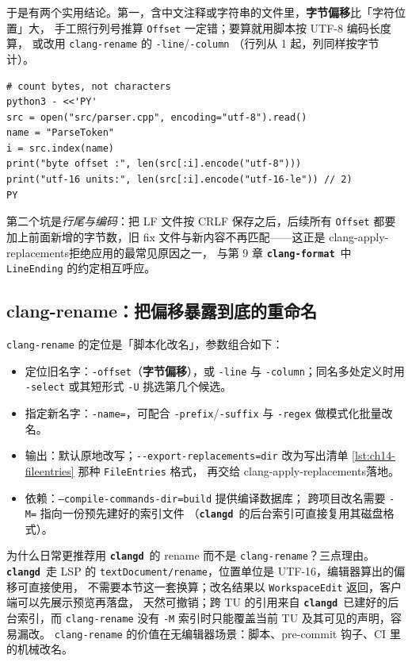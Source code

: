 \documentclass[12pt,a4paper,fontset=fandol]{ctexbook}
\newcommand{\Tp}[1]{\texttt{#1}}
\newcommand{\Opt}[1]{\texttt{-\/-#1}}
\newcommand{\Bk}{\discretionary{}{}{}}
\newcommand{\Lib}[1]{\textbf{\texttt{#1}}}
\newcommand{\Fmt}{\Lib{clang-format}}
\newcommand{\CD}{\Lib{clangd}}
\begin{document}
于是有两个实用结论。第一，含中文注释或字符串的文件里，\textbf{字节偏移}比「字符位置」大，
手工照行列号推算 \texttt{Offset} 一定错；要算就用脚本按 UTF-8 编码长度算，
或改用 \texttt{clang-rename} 的 \texttt{-line}/{\Bk}\texttt{-column}
（行列从 1 起，列同样按字节计）。

\begin{lstlisting}[style=shellstyle,caption={同一位置的字节偏移与 UTF-16 码元数},label={lst:ch14-offset}]
# count bytes, not characters
python3 - <<'PY'
src = open("src/parser.cpp", encoding="utf-8").read()
name = "ParseToken"
i = src.index(name)
print("byte offset :", len(src[:i].encode("utf-8")))
print("utf-16 units:", len(src[:i].encode("utf-16-le")) // 2)
PY
\end{lstlisting}

第二个坑是\emph{行尾与编码}：把 LF 文件按 CRLF 保存之后，后续所有 \texttt{Offset}
都要加上前面新增的字节数，旧 fix 文件与新内容不再匹配——这正是
\Bk clang-apply-replacements\Bk 拒绝应用的最常见原因之一，
与第 9 章 \Fmt\ 中 \texttt{LineEnding} 的约定相互呼应。

\subsection*{clang-rename：把偏移暴露到底的重命名}

\texttt{clang-rename} 的定位是「脚本化改名」，参数组合如下：

\begin{itemize}
  \item 定位旧名字：\texttt{-offset}（\textbf{字节偏移}），或 \texttt{-line} 与
        \texttt{-column}；同名多处定义时用 \texttt{-select} 或其短形式 \texttt{-U}
        挑选第几个候选。
  \item 指定新名字：\texttt{-name=}，可配合 \texttt{-prefix}/{\Bk}\texttt{-suffix}
        与 \texttt{-regex} 做模式化批量改名。
  \item 输出：默认原地改写；\Opt{export-{\Bk}replacements=\allowbreak dir}
        改为写出清单 \ref{lst:ch14-fileentries} 那种 \texttt{FileEntries} 格式，
        再交给 \Bk clang-{\Bk}apply-{\Bk}replacements\Bk 落地。
  \item 依赖：\texttt{--compile-{\Bk}commands-{\Bk}dir=build} 提供编译数据库；
        跨项目改名需要 \texttt{-M=} 指向一份预先建好的索引文件
        （\CD\ 的后台索引可直接复用其磁盘格式）。
\end{itemize}

为什么日常更推荐用 \CD\ 的 rename 而不是 \texttt{clang-rename}？三点理由。
\CD\ 走 LSP 的 \texttt{textDocument/rename}，位置单位是 UTF-16，编辑器算出的偏移可直接使用，
不需要本节这一套换算；改名结果以 \Tp{WorkspaceEdit} 返回，客户端可以先展示预览再落盘，
天然可撤销；跨 TU 的引用来自 \CD\ 已建好的后台索引，而 \texttt{clang-rename}
没有 \texttt{-M} 索引时只能覆盖当前 TU 及其可见的声明，容易漏改。
\texttt{clang-rename} 的价值在无编辑器场景：脚本、pre-commit 钩子、CI 里的机械改名。
\end{document}
